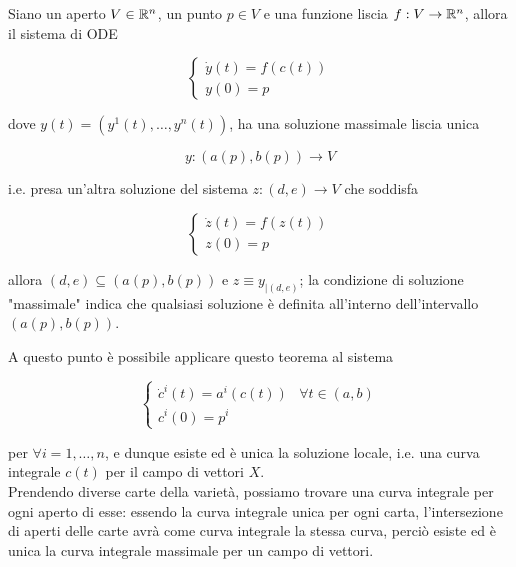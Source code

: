 \begin{theorem}
	Siano un aperto $ V \in \mathbb{R}^{n} $, un punto $ p \in V $ e una funzione liscia $ f : V \to \mathbb{R}^{n} $, allora il sistema di ODE
	
	\begin{equation}
		\begin{cases}
			\dot{y}(t) = f(c(t))\\
			y(0) = p
		\end{cases}
	\end{equation}
	
	dove $ y(t) = (y^{1}(t),\dots,y^{n}(t)) $, ha una soluzione massimale liscia unica
	
	\begin{equation}
		y : (a(p),b(p)) \to V
	\end{equation}

	i.e. presa un'altra soluzione del sistema $ z : (d,e) \to V $ che soddisfa
	
	\begin{equation}
		\begin{cases}
			\dot{z}(t) = f(z(t))\\
			z(0) = p
		\end{cases}
	\end{equation}

	allora $ (d,e) \subseteq (a(p),b(p)) $ e $ z \equiv y_{|(d,e)} $; la condizione di soluzione "massimale" indica che qualsiasi soluzione è definita all'interno dell'intervallo $ (a(p),b(p)) $.
\end{theorem}

A questo punto è possibile applicare questo teorema al sistema

\begin{equation}
	\begin{cases}
		\dot{c}^{i}(t) = a^{i}(c(t)) & \forall t \in (a,b)\\
		c^{i}(0) = p^{i}
	\end{cases}
\end{equation}

per $ \forall i=1,\dots,n $, e dunque esiste ed è unica la soluzione locale, i.e. una curva integrale $ c(t) $ per il campo di vettori $ X $.\\
Prendendo diverse carte della varietà, possiamo trovare una curva integrale per ogni aperto di esse: essendo la curva integrale unica per ogni carta, l'intersezione di aperti delle carte avrà come curva integrale la stessa curva, perciò esiste ed è unica la curva integrale massimale per un campo di vettori.

